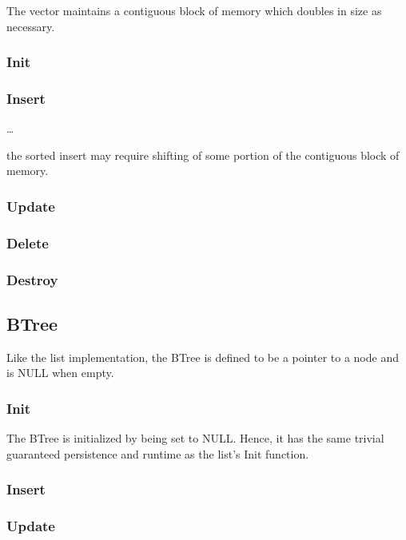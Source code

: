 \documentclass[twocolumn]{article}
\begin{document}
The vector maintains a contiguous block of memory which doubles in size as
necessary.

\subsubsection{Init}

\subsubsection{Insert}

\dots

the sorted insert may require shifting of some portion of the contiguous block
of memory.

\subsubsection{Update}

\subsubsection{Delete}

\subsubsection{Destroy}

\subsection{BTree}

Like the list implementation, the BTree is defined to be a pointer to a node and
is NULL when empty.

\subsubsection{Init}

The BTree is initialized by being set to NULL. Hence, it has the same trivial
guaranteed persistence and runtime as the list's Init function.

\subsubsection{Insert}

\subsubsection{Update}
\end{document}
